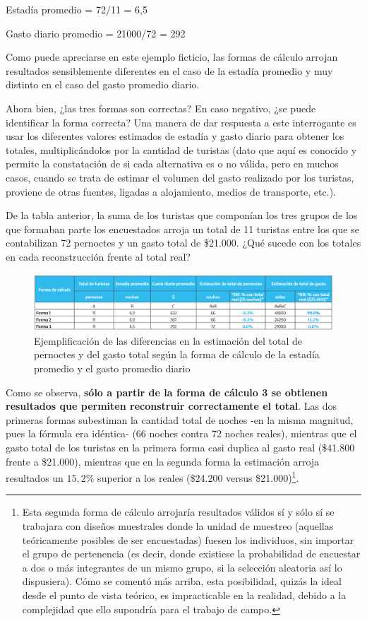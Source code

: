 \documentclass[
]{book}
\begin{document}
Estadía promedio = 72/11 = 6,5

Gasto diario promedio = 21000/72 = 292

Como puede apreciarse en este ejemplo ficticio, las formas de cálculo arrojan resultados sensiblemente diferentes en el caso de la estadía promedio y muy distinto en el caso del gasto promedio diario.

Ahora bien, ¿las tres formas son correctas? En caso negativo, ¿se puede identificar la forma correcta? Una manera de dar respuesta a este interrogante es usar los diferentes valores estimados de estadía y gasto diario para obtener los totales, multiplicándolos por la cantidad de turistas (dato que aquí es conocido y permite la constatación de si cada alternativa es o no válida, pero en muchos casos, cuando se trata de estimar el volumen del gasto realizado por los turistas, proviene de otras fuentes, ligadas a alojamiento, medios de transporte, etc.).

De la tabla anterior, la suma de los turistas que componían los tres grupos de los que formaban parte los encuestados arroja un total de 11 turistas entre los que se contabilizan 72 pernoctes y un gasto total de \$21.000. ¿Qué sucede con los totales en cada reconstrucción frente al total real?

\begin{figure}

{\centering \includegraphics[width=1\linewidth]{imagenes/tabla_7} 

}

\caption{Ejemplificación de las diferencias en la estimación del total de pernoctes y del gasto total según la forma de cálculo de la estadía promedio y el gasto promedio diario}\label{fig:Totalreal}
\end{figure}

Como se observa, \textbf{sólo a partir de la forma de cálculo 3 se obtienen resultados que permiten reconstruir correctamente el total}. Las dos primeras formas subestiman la cantidad total de noches -en la misma magnitud, pues la fórmula era idéntica- (66 noches contra 72 noches reales), mientras que el gasto total de los turistas en la primera forma casi duplica al gasto real (\$41.800 frente a \$21.000), mientras que en la segunda forma la estimación arroja resultados un \(15,2\%\) superior a los reales (\$24.200 versus \$21.000)\footnote{Esta segunda forma de cálculo arrojaría resultados válidos sí y sólo sí se trabajara con diseños muestrales donde la unidad de muestreo (aquellas teóricamente posibles de ser encuestadas) fuesen los individuos, sin importar el grupo de pertenencia (es decir, donde existiese la probabilidad de encuestar a dos o más integrantes de un mismo grupo, si la selección aleatoria así lo dispusiera). Cómo se comentó más arriba, esta posibilidad, quizás la ideal desde el punto de vista teórico, es impracticable en la realidad, debido a la complejidad que ello supondría para el trabajo de campo.}.
\end{document}
